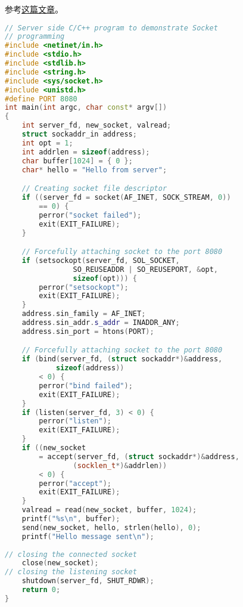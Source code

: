 
\begin{issues}
\issueDraft
\end{issues}

参考\href{https://www.geeksforgeeks.org/socket-programming-cc/}{这篇文章}。

\begin{lstlisting}[language=cpp, caption=server.cpp]
// Server side C/C++ program to demonstrate Socket
// programming
#include <netinet/in.h>
#include <stdio.h>
#include <stdlib.h>
#include <string.h>
#include <sys/socket.h>
#include <unistd.h>
#define PORT 8080
int main(int argc, char const* argv[])
{
	int server_fd, new_socket, valread;
	struct sockaddr_in address;
	int opt = 1;
	int addrlen = sizeof(address);
	char buffer[1024] = { 0 };
	char* hello = "Hello from server";

	// Creating socket file descriptor
	if ((server_fd = socket(AF_INET, SOCK_STREAM, 0))
		== 0) {
		perror("socket failed");
		exit(EXIT_FAILURE);
	}

	// Forcefully attaching socket to the port 8080
	if (setsockopt(server_fd, SOL_SOCKET,
				SO_REUSEADDR | SO_REUSEPORT, &opt,
				sizeof(opt))) {
		perror("setsockopt");
		exit(EXIT_FAILURE);
	}
	address.sin_family = AF_INET;
	address.sin_addr.s_addr = INADDR_ANY;
	address.sin_port = htons(PORT);

	// Forcefully attaching socket to the port 8080
	if (bind(server_fd, (struct sockaddr*)&address,
			sizeof(address))
		< 0) {
		perror("bind failed");
		exit(EXIT_FAILURE);
	}
	if (listen(server_fd, 3) < 0) {
		perror("listen");
		exit(EXIT_FAILURE);
	}
	if ((new_socket
		= accept(server_fd, (struct sockaddr*)&address,
				(socklen_t*)&addrlen))
		< 0) {
		perror("accept");
		exit(EXIT_FAILURE);
	}
	valread = read(new_socket, buffer, 1024);
	printf("%s\n", buffer);
	send(new_socket, hello, strlen(hello), 0);
	printf("Hello message sent\n");
	
// closing the connected socket
	close(new_socket);
// closing the listening socket
	shutdown(server_fd, SHUT_RDWR);
	return 0;
}
\end{lstlisting}


